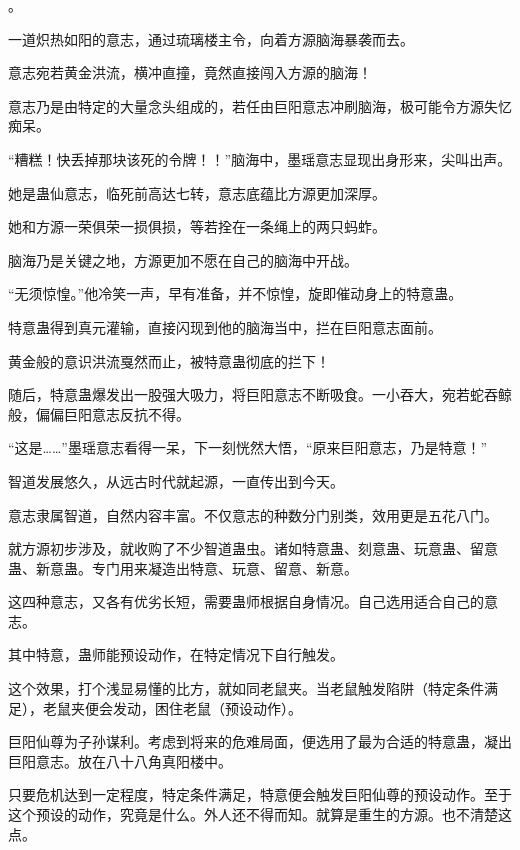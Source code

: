 
\begin{this_body}



。

一道炽热如阳的意志，通过琉璃楼主令，向着方源脑海暴袭而去。

意志宛若黄金洪流，横冲直撞，竟然直接闯入方源的脑海！

意志乃是由特定的大量念头组成的，若任由巨阳意志冲刷脑海，极可能令方源失忆痴呆。

“糟糕！快丢掉那块该死的令牌！！”脑海中，墨瑶意志显现出身形来，尖叫出声。

她是蛊仙意志，临死前高达七转，意志底蕴比方源更加深厚。

她和方源一荣俱荣一损俱损，等若拴在一条绳上的两只蚂蚱。

脑海乃是关键之地，方源更加不愿在自己的脑海中开战。

“无须惊惶。”他冷笑一声，早有准备，并不惊惶，旋即催动身上的特意蛊。

特意蛊得到真元灌输，直接闪现到他的脑海当中，拦在巨阳意志面前。

黄金般的意识洪流戛然而止，被特意蛊彻底的拦下！

随后，特意蛊爆发出一股强大吸力，将巨阳意志不断吸食。一小吞大，宛若蛇吞鲸般，偏偏巨阳意志反抗不得。

“这是……”墨瑶意志看得一呆，下一刻恍然大悟，“原来巨阳意志，乃是特意！”

智道发展悠久，从远古时代就起源，一直传出到今天。

意志隶属智道，自然内容丰富。不仅意志的种数分门别类，效用更是五花八门。

就方源初步涉及，就收购了不少智道蛊虫。诸如特意蛊、刻意蛊、玩意蛊、留意蛊、新意蛊。专门用来凝造出特意、玩意、留意、新意。

这四种意志，又各有优劣长短，需要蛊师根据自身情况。自己选用适合自己的意志。

其中特意，蛊师能预设动作，在特定情况下自行触发。

这个效果，打个浅显易懂的比方，就如同老鼠夹。当老鼠触发陷阱（特定条件满足），老鼠夹便会发动，困住老鼠（预设动作）。

巨阳仙尊为子孙谋利。考虑到将来的危难局面，便选用了最为合适的特意蛊，凝出巨阳意志。放在八十八角真阳楼中。

只要危机达到一定程度，特定条件满足，特意便会触发巨阳仙尊的预设动作。至于这个预设的动作，究竟是什么。外人还不得而知。就算是重生的方源。也不清楚这点。


\end{this_body}
